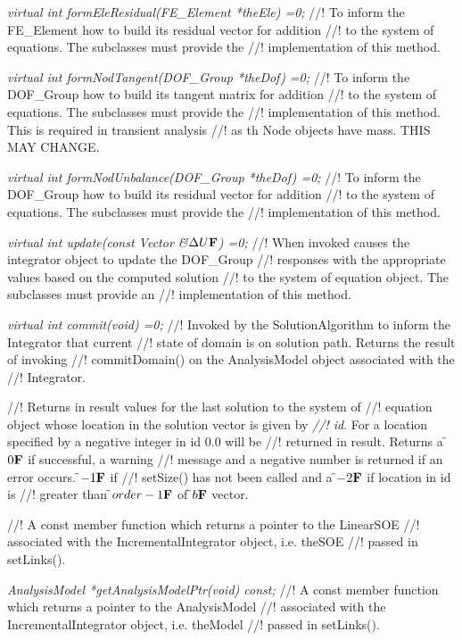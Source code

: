 {\em virtual int formEleResidual(FE\_Element *theEle) =0;}
//! To inform the FE\_Element how to build its residual vector for addition
//! to the system of equations. The subclasses must provide the
//! implementation of this method.

{\em virtual int formNodTangent(DOF\_Group *theDof) =0;}
//! To inform the DOF\_Group how to build its tangent matrix for addition
//! to the system of equations. The subclasses must provide the
//! implementation of this method. This is required in transient analysis
//! as th Node objects have mass. THIS MAY CHANGE.

{\em virtual int formNodUnbalance(DOF\_Group *theDof) =0;}
//! To inform the DOF\_Group how to build its residual vector for addition
//! to the system of equations. The subclasses must provide the
//! implementation of this method.

{\em virtual int update(const Vector \&\f$\Delta U{\bf F}$) =0;}
//! When invoked causes the integrator object to update the DOF\_Group
//! responses with the appropriate values based on the computed solution
//! to the system of equation object. The subclasses must provide an
//! implementation of this method.

{\em virtual int commit(void) =0;}
//! Invoked by the SolutionAlgorithm to inform the Integrator that current
//! state of domain is on solution path. Returns the result of invoking
//! commitDomain() on the AnalysisModel object associated with the
//! Integrator.


//! Returns in \p result values for the last solution to the system of
//! equation object whose location in the solution vector is given by {\em
//! id}. For a location specified by a negative integer in \p id 0.0 will be
//! returned in \p result. Returns a \f$0{\bf F}$ if successful, a warning
//! message and a negative number is returned if an error occurs. \f$-1{\bf F}$ if
//! setSize() has not been called and a \f$-2{\bf F}$ if location in \p id is
//! greater than \f$order-1{\bf F}$ of \f$b{\bf F}$ vector.

//! A const member function which returns a pointer to the LinearSOE
//! associated with the IncrementalIntegrator object, i.e. \p theSOE
//! passed in setLinks().

{\em AnalysisModel *getAnalysisModelPtr(void) const;}
//! A const member function which returns a pointer to the AnalysisModel
//! associated with the IncrementalIntegrator object, i.e. \p theModel
//! passed in setLinks().


